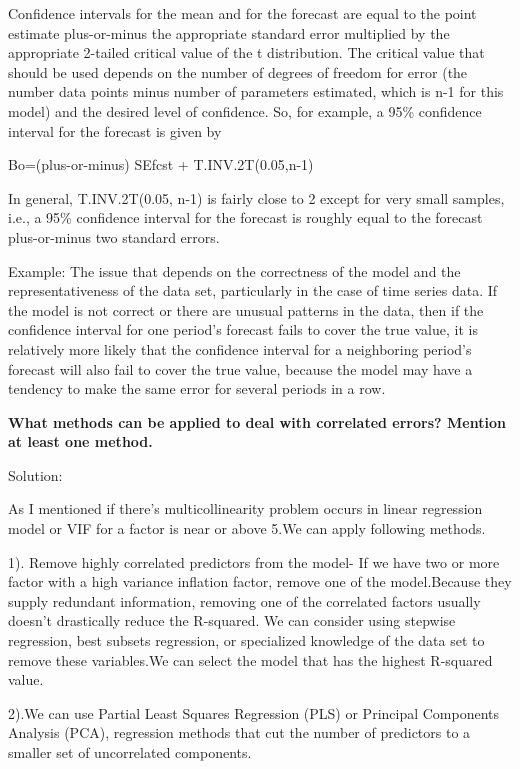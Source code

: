 \documentclass[]{article}
\begin{document}
Confidence intervals for the mean and for the forecast are equal to the
point estimate plus-or-minus the appropriate standard error multiplied
by the appropriate 2-tailed critical value of the t distribution. The
critical value that should be used depends on the number of degrees of
freedom for error (the number data points minus number of parameters
estimated, which is n-1 for this model) and the desired level of
confidence. So, for example, a 95\% confidence interval for the forecast
is given by

Bo=(plus-or-minus) SEfcst + T.INV.2T(0.05,n-1)

In general, T.INV.2T(0.05, n-1) is fairly close to 2 except for very
small samples, i.e., a 95\% confidence interval for the forecast is
roughly equal to the forecast plus-or-minus two standard errors.

Example: The issue that depends on the correctness of the model and the
representativeness of the data set, particularly in the case of time
series data. If the model is not correct or there are unusual patterns
in the data, then if the confidence interval for one period's forecast
fails to cover the true value, it is relatively more likely that the
confidence interval for a neighboring period's forecast will also fail
to cover the true value, because the model may have a tendency to make
the same error for several periods in a row.

\textbf{What methods can be applied to deal with correlated errors?
Mention at least one method.}

Solution:

As I mentioned if there's multicollinearity problem occurs in linear
regression model or VIF for a factor is near or above 5.We can apply
following methods.

1). Remove highly correlated predictors from the model- If we have two
or more factor with a high variance inflation factor, remove one of the
model.Because they supply redundant information, removing one of the
correlated factors usually doesn't drastically reduce the R-squared. We
can consider using stepwise regression, best subsets regression, or
specialized knowledge of the data set to remove these variables.We can
select the model that has the highest R-squared value.

2).We can use Partial Least Squares Regression (PLS) or Principal
Components Analysis (PCA), regression methods that cut the number of
predictors to a smaller set of uncorrelated components.
\end{document}
